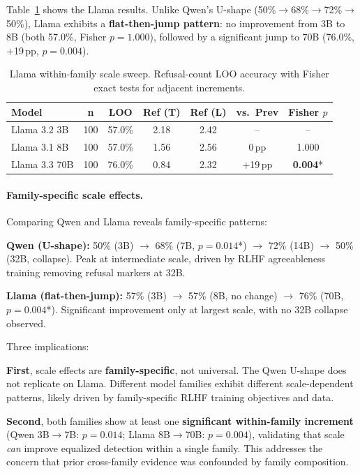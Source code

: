 Table~\ref{tab:llama_scale_sweep} shows the Llama results. Unlike Qwen's U-shape (50\%$\to$68\%$\to$72\%$\to$50\%), Llama exhibits a \textbf{flat-then-jump pattern}: no improvement from 3B to 8B (both 57.0\%, Fisher $p=1.000$), followed by a significant jump to 70B (76.0\%, $+$19\,pp, $p=0.004$).

\begin{table}[h]
\centering
\caption{Llama within-family scale sweep. Refusal-count LOO accuracy with Fisher exact tests for adjacent increments.}
\label{tab:llama_scale_sweep}
\begin{tabular}{lcccccc}
\toprule
\textbf{Model} & \textbf{n} & \textbf{LOO} & \textbf{Ref (T)} & \textbf{Ref (L)} & \textbf{vs.\ Prev} & \textbf{Fisher $p$} \\
\midrule
Llama 3.2 3B  & 100 & 57.0\% & 2.18 & 2.42 & -- & -- \\
Llama 3.1 8B  & 100 & 57.0\% & 1.56 & 2.56 & 0\,pp & 1.000 \\
Llama 3.3 70B & 100 & 76.0\% & 0.84 & 2.32 & +19\,pp & \textbf{0.004}* \\
\bottomrule
\end{tabular}
\end{table}

\paragraph{Family-specific scale effects.}
Comparing Qwen and Llama reveals family-specific patterns:

\textbf{Qwen (U-shape):} 50\% (3B) $\to$ 68\% (7B, $p=0.014$*) $\to$ 72\% (14B) $\to$ 50\% (32B, collapse). Peak at intermediate scale, driven by RLHF agreeableness training removing refusal markers at 32B.

\textbf{Llama (flat-then-jump):} 57\% (3B) $\to$ 57\% (8B, no change) $\to$ 76\% (70B, $p=0.004$*). Significant improvement only at largest scale, with no 32B collapse observed.

Three implications:

\textbf{First}, scale effects are \textbf{family-specific}, not universal. The Qwen U-shape does not replicate on Llama. Different model families exhibit different scale-dependent patterns, likely driven by family-specific RLHF training objectives and data.

\textbf{Second}, both families show at least one \textbf{significant within-family increment} (Qwen 3B$\to$7B: $p=0.014$; Llama 8B$\to$70B: $p=0.004$), validating that scale \emph{can} improve equalized detection within a single family. This addresses the concern that prior cross-family evidence was confounded by family composition.

